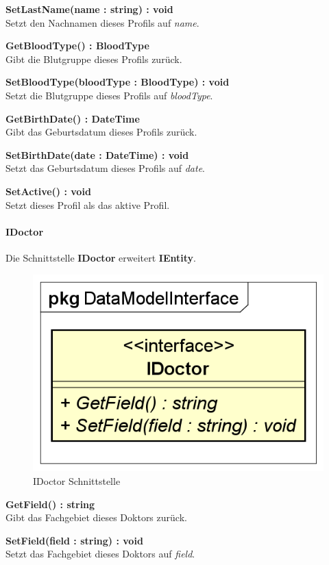 \documentclass[a4paper]{scrreprt}
\begin{document}
\textbf{SetLastName(name : string) : void}\\
Setzt den Nachnamen dieses Profils auf \textit{name}.

\textbf{GetBloodType() : BloodType}\\
Gibt die Blutgruppe dieses Profils zurück.

\textbf{SetBloodType(bloodType : BloodType) : void}\\
Setzt die Blutgruppe dieses Profils auf \textit{bloodType}.

\textbf{GetBirthDate() : DateTime}\\
Gibt das Geburtsdatum dieses Profils zurück.

\textbf{SetBirthDate(date : DateTime) : void}\\
Setzt das Geburtsdatum dieses Profils auf \textit{date}.

\textbf{SetActive() : void}\\
Setzt dieses Profil als das aktive Profil.

\paragraph{IDoctor}
Die Schnittstelle \textbf{IDoctor} erweitert \textbf{IEntity}.

\begin{figure}[H]
\centering
\includegraphics[width=0.45\textheight]{graphics/Klassendiagramme/Model/IDoctor.png}
\caption{IDoctor Schnittstelle}
\end{figure}
\textbf{GetField() : string}\\
Gibt das Fachgebiet dieses Doktors zurück.

\textbf{SetField(field : string) : void}\\
Setzt das Fachgebiet dieses Doktors auf \textit{field}.
\end{document}
